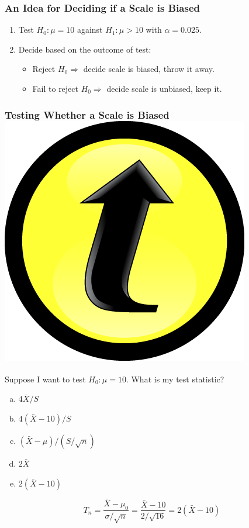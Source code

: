 \documentclass[handout]{beamer}
\begin{document}
\begin{frame}
	\frametitle{An Idea for Deciding if a Scale is Biased}

\begin{enumerate}
	\item Test $H_0 \colon \mu = 10$ against $H_1\colon \mu > 10$ with $\alpha =0.025$.
	\item Decide based on the outcome of test:
		\begin{itemize}
	\item Reject $H_0 \Rightarrow$ decide scale is biased, throw it away.
	\item Fail to reject $H_0 \Rightarrow$ decide scale is unbiased, keep it.
			\end{itemize}	
\end{enumerate}

\end{frame}
\begin{frame}[t]
	\frametitle{Testing Whether a Scale is Biased \hfill \includegraphics[scale = 0.05]{./images/clicker}}

	\vspace{2em}

	Suppose I want to test $H_0\colon \mu = 10$. What is my test statistic? 

	\vspace{1em}

	\begin{enumerate}[(a)]
		\item $4\bar{X}/S$  
		\item $4(\bar{X} - 10)/S$
		\item $(\bar{X} - \mu)/(S/\sqrt{n})$
		\item $2 \bar{X}$
		\item $2(\bar{X} - 10)$ 
	\end{enumerate}

	\pause
	\alert{$$T_n = \frac{\bar{X} - \mu_0}{\sigma/\sqrt{n}} = \frac{\bar{X} - 10}{2/\sqrt{16}} = 2(\bar{X} - 10)$$}
\end{frame}
\end{document}
